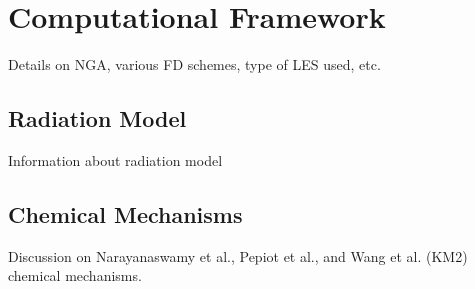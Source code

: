 \section{Computational Framework}
\label{sec:lesresults:comput}

Details on NGA, various FD schemes, type of LES used, etc.


\subsection{Radiation Model}
\label{sec:lesresults:comput:rad}

Information about radiation model


\subsection{Chemical Mechanisms}
\label{sec:lesresults:comput:chem}

Discussion on Narayanaswamy et al., Pepiot et al., and Wang et al. (KM2) chemical mechanisms.

